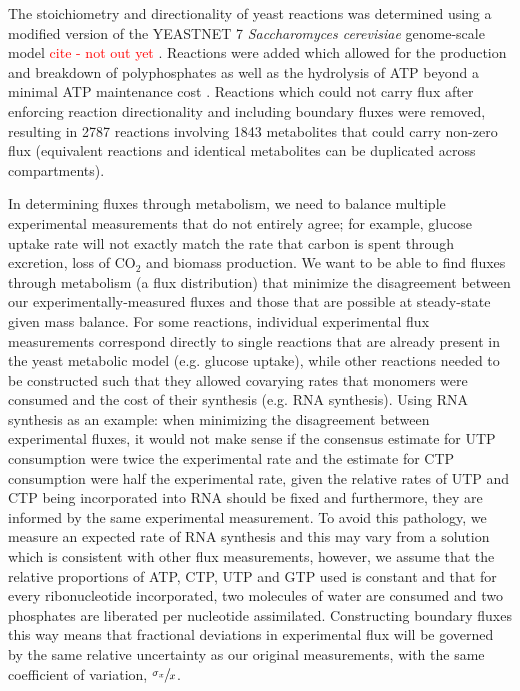 The stoichiometry and directionality of yeast reactions was determined using a modified version of the YEASTNET 7 \textit{Saccharomyces cerevisiae} genome-scale model \textcolor{red}{cite - not out yet} \cite{Herrgard:2008gb}.  Reactions were added which allowed for the production and breakdown of polyphosphates as well as the hydrolysis of ATP beyond a minimal ATP maintenance cost \cite{Famili:2003gl}.  Reactions which could not carry flux after enforcing reaction directionality and including boundary fluxes were removed, resulting in 2787 reactions involving 1843 metabolites that could carry non-zero flux (equivalent reactions and identical metabolites can be duplicated across compartments).

In determining fluxes through metabolism, we need to balance multiple experimental measurements that do not entirely agree; for example, glucose uptake rate will not exactly match the rate that carbon is spent through excretion, loss of CO$_{2}$ and biomass production. We want to be able to find fluxes through metabolism (a flux distribution) that minimize the disagreement between our experimentally-measured fluxes and those that are possible at steady-state given mass balance.  For some reactions, individual experimental flux measurements correspond directly to single reactions that are already present in the yeast metabolic model (e.g. glucose uptake), while other reactions needed to be constructed such that they allowed covarying rates that monomers were consumed and the cost of their synthesis (e.g. RNA synthesis).  Using RNA synthesis as an example: when minimizing the disagreement between experimental fluxes, it would not make sense if the consensus estimate for UTP consumption were twice the experimental rate and the estimate for CTP consumption were half the experimental rate, given the relative rates of UTP and CTP being incorporated into RNA should be fixed and furthermore, they are informed by the same experimental measurement.  To avoid this pathology, we measure an expected rate of RNA synthesis and this may vary from a solution which is consistent with other flux measurements, however, we assume that the relative proportions of ATP, CTP, UTP and GTP used is constant and that for every ribonucleotide incorporated, two molecules of water are consumed and two phosphates are liberated per nucleotide assimilated.  Constructing boundary fluxes this way means that fractional deviations in experimental flux will be governed by the same relative uncertainty as our original measurements, with the same coefficient of variation, $\sfrac{\sigma_{x}}{x}$.

